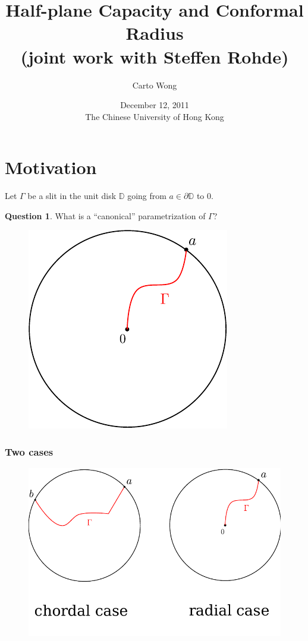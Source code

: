 \documentclass[xcolor=pdftex,dvipsnames,table]{beamer}
\title{Half-plane Capacity and Conformal Radius\\
       (joint work with Steffen Rohde)}
\author{Carto Wong}
\institute{University of Washington}
\date{December 12, 2011\\The Chinese University of Hong Kong}
\newcommand{\bbD}{\mathbb{D}}
\newcommand{\gR}{\Gamma}
\theoremstyle{definition}
\newtheorem{question}{Question}
\begin{document}
\maketitle

\section{Motivation}

\begin{frame}
  Let $\gR$ be a slit in the unit disk $\bbD$ going from $a \in \partial \bbD$ to 0.
  \begin{question}
    What is a ``canonical'' parametrization of $\gR$?
  \end{question}
  \begin{figure}
    \includegraphics[scale=0.8]{figures/radialSlit.pdf}
  \end{figure}
\end{frame}

\begin{frame}
  \frametitle{Two cases}
  \begin{figure}
    \includegraphics[scale=0.6]{figures/twoCases.pdf}
  \end{figure}
\end{frame}
\end{document}
